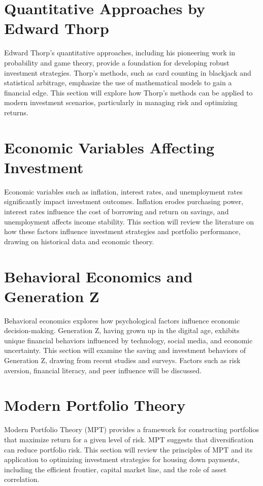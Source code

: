 \documentclass[12pt]{report}
\begin{document}
\section{Quantitative Approaches by Edward Thorp}
Edward Thorp’s quantitative approaches, including his pioneering work in probability and game theory, provide a foundation for developing robust investment strategies. Thorp's methods, such as card counting in blackjack and statistical arbitrage, emphasize the use of mathematical models to gain a financial edge. This section will explore how Thorp’s methods can be applied to modern investment scenarios, particularly in managing risk and optimizing returns.

\section{Economic Variables Affecting Investment}
Economic variables such as inflation, interest rates, and unemployment rates significantly impact investment outcomes. Inflation erodes purchasing power, interest rates influence the cost of borrowing and return on savings, and unemployment affects income stability. This section will review the literature on how these factors influence investment strategies and portfolio performance, drawing on historical data and economic theory.

\section{Behavioral Economics and Generation Z}
Behavioral economics explores how psychological factors influence economic decision-making. Generation Z, having grown up in the digital age, exhibits unique financial behaviors influenced by technology, social media, and economic uncertainty. This section will examine the saving and investment behaviors of Generation Z, drawing from recent studies and surveys. Factors such as risk aversion, financial literacy, and peer influence will be discussed.

\section{Modern Portfolio Theory}
Modern Portfolio Theory (MPT) provides a framework for constructing portfolios that maximize return for a given level of risk. MPT suggests that diversification can reduce portfolio risk. This section will review the principles of MPT and its application to optimizing investment strategies for housing down payments, including the efficient frontier, capital market line, and the role of asset correlation.
\end{document}
